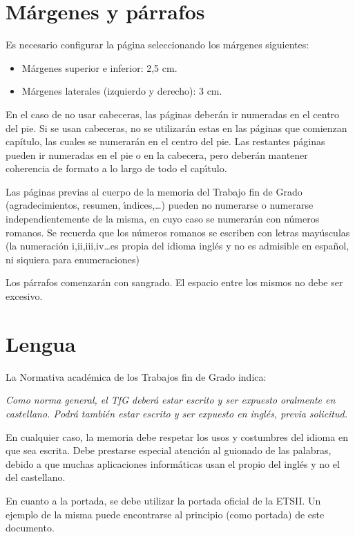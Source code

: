  

\FloatBarrier
\section{Márgenes y párrafos}\label{sec:margenes}

Es necesario configurar la página seleccionando los márgenes siguientes:
\begin{itemize}
 \item Márgenes superior e inferior: 2,5 cm. 
 \item Márgenes laterales (izquierdo y derecho): 3 cm.
\end{itemize}

En el caso de no usar cabeceras, las páginas deber\'an ir numeradas en el centro del pie.
Si se usan cabeceras, no se utilizarán estas en las p\'aginas que comienzan capítulo, las cuales
se numerar\'an en el centro del pie. Las restantes p\'aginas pueden ir numeradas en el pie o en la cabecera,
pero deber\'an mantener coherencia de formato a lo largo de todo el cap{\'\i}tulo.

Las p\'aginas previas al cuerpo de la memoria del Trabajo fin de Grado (agradecimientos, resumen, {\'\i}ndices,\dots) 
pueden no numerarse o
numerarse independientemente de la misma, en cuyo caso se numerar\'an con n\'umeros romanos. 
Se recuerda que los n\'umeros romanos
se escriben con letras may\'usculas (la numeraci\'on i,ii,iii,iv\dots es propia del idioma ingl\'es 
y no es admisible en espa{\~n}ol, ni siquiera para enumeraciones)

Los p\'arrafos comenzar\'an con sangrado. El espacio entre los mismos no debe ser excesivo.

\FloatBarrier
\section{Lengua}\label{sec:lengua}

La Normativa académica de los Trabajos fin de Grado indica:

\emph{Como norma general, el TfG deberá estar escrito y ser expuesto oralmente en castellano.
Podrá también estar escrito y ser expuesto en inglés, previa solicitud.}

En cualquier caso, la memoria debe respetar los usos y costumbres del idioma en que sea escrita.
Debe prestarse especial atenci\'on al guionado de las palabras, debido a que muchas aplicaciones inform\'aticas
usan el propio del ingl\'es y no el del castellano.

En cuanto a la portada, se debe utilizar la portada oficial de la ETSII. Un ejemplo de la misma puede encontrarse al 
principio (como portada) de este documento.


 
